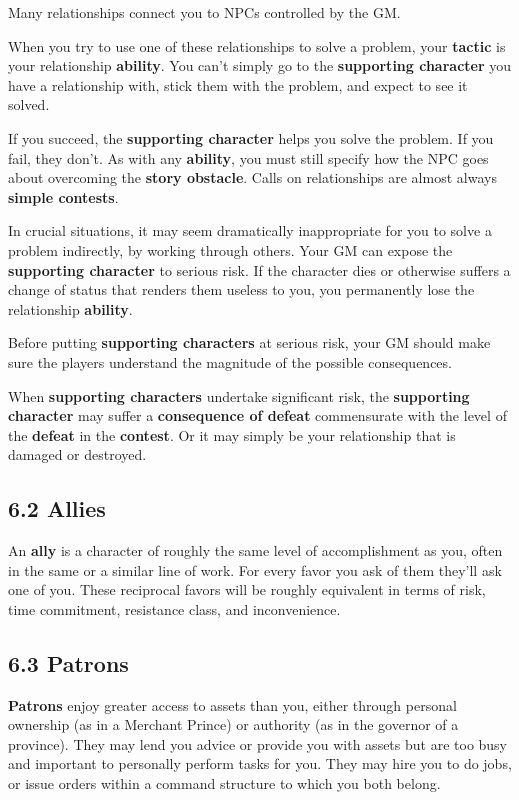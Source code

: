 \documentclass[
]{article}
\begin{document}
Many relationships connect you to NPCs controlled by the GM.

When you try to use one of these relationships to solve a problem, your
\textbf{tactic} is your relationship \textbf{ability}. You can't simply
go to the \textbf{supporting character} you have a relationship with,
stick them with the problem, and expect to see it solved.

If you succeed, the \textbf{supporting character} helps you solve the
problem. If you fail, they don't. As with any \textbf{ability}, you must
still specify how the NPC goes about overcoming the \textbf{story
obstacle}. Calls on relationships are almost always \textbf{simple
contests}.

In crucial situations, it may seem dramatically inappropriate for you to
solve a problem indirectly, by working through others. Your GM can
expose the \textbf{supporting character} to serious risk. If the
character dies or otherwise suffers a change of status that renders them
useless to you, you permanently lose the relationship \textbf{ability}.

Before putting \textbf{supporting characters} at serious risk, your GM
should make sure the players understand the magnitude of the possible
consequences.

When \textbf{supporting characters} undertake significant risk, the
\textbf{supporting character} may suffer a \textbf{consequence of
defeat} commensurate with the level of the \textbf{defeat} in the
\textbf{contest}. Or it may simply be your relationship that is damaged
or destroyed.

\hypertarget{allies}{%
\subsection{6.2 Allies}\label{allies}}

An \textbf{ally} is a character of roughly the same level of
accomplishment as you, often in the same or a similar line of work. For
every favor you ask of them they'll ask one of you. These reciprocal
favors will be roughly equivalent in terms of risk, time commitment,
resistance class, and inconvenience.

\hypertarget{patrons}{%
\subsection{6.3 Patrons}\label{patrons}}

\textbf{Patrons} enjoy greater access to assets than you, either through
personal ownership (as in a Merchant Prince) or authority (as in the
governor of a province). They may lend you advice or provide you with
assets but are too busy and important to personally perform tasks for
you. They may hire you to do jobs, or issue orders within a command
structure to which you both belong.
\end{document}
